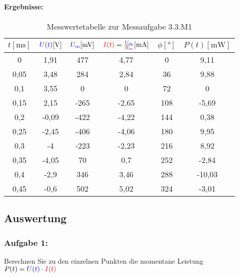 \documentclass[a4paper,titlepage,parskip]{scrreprt}
\newcommand{\spannung}[1]{\textcolor{blue}{#1}}
\newcommand{\strom}[1]{\textcolor{red}{#1}}
\newcommand{\widerstand}[1]{\textcolor{violet}{#1}}
\begin{document}
                   \paragraph{Ergebnisse:}
                   \begin{center}
                       \begin{table}[!hbtp]
                           \caption{Messwertetabelle zur Messaufgabe 3.3.M1}
                           \label{tbl:messergebnisse3.1}
                           \renewcommand{\arraystretch}{1.3}
                           \begin{center}
                               \begin{tabular}{c|ccccc}
									$t [\si{\milli\second}]$ & $\spannung{U(t)} [\si{\volt}]$ & $\spannung{U_m} [\si{\milli\volt}]$ & $\strom{I(t)} = \frac{\spannung{U_m}}{\widerstand{R_m}} [\si{\milli\ampere}]$ & $\phi [°]$ & $P(t) [\si{\milli\watt}]$\\ \hline
									0 & 1,91 & 477 & 4,77 & 0 & 9,11\\
									0,05 & 3,48 & 284 & 2,84 & 36 & 9,88\\
									0,1 & 3,55 & 0 & 0 & 72 & 0\\
									0,15 & 2,15 & -265 & -2,65 & 108 & -5,69\\
									0,2 & -0,09 & -422 & -4,22 & 144 & 0,38\\
									0,25 & -2,45 & -406 & -4,06 & 180 & 9,95\\
									0,3 & -4 & -223 & -2,23 & 216 & 8,92\\
									0,35 & -4,05 & 70 & 0,7 & 252 & -2,84\\
									0,4 & -2,9 & 346 & 3,46 & 288 & -10,03\\
									0,45 & -0,6 & 502 & 5,02 & 324 & -3,01\\
							   \end{tabular}
                           \end{center}
                       \end{table}
                   \end{center}
                   
                   
                   \subsection{Auswertung}
                   \subsubsection{Aufgabe 1:}  Berechnen Sie zu den einzelnen Punkten die momentane Leistung $P(t) = \spannung{U(t)} \cdot \strom{I(t)}$ 
                   
\end{document}

